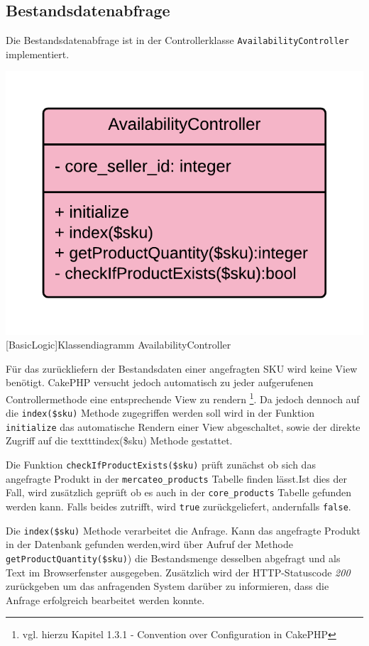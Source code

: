 	\subsection{Bestandsdatenabfrage}
	
	Die Bestandsdatenabfrage ist in der Controllerklasse \texttt{AvailabilityController} implementiert.
	
	\begin{minipage}{\linewidth}
		\vspace{1em}
		\centering
		\includegraphics[width=0.4 \linewidth]{img/AvailabilityControllerUML}
		[BasicLogic]{Klassendiagramm AvailabilityController}
		\vspace{1em}
	\end{minipage}
	
	Für das zurückliefern der Bestandsdaten einer angefragten SKU wird keine View benötigt. CakePHP versucht jedoch automatisch zu jeder aufgerufenen Controllermethode eine entsprechende View zu rendern \footnote{vgl. hierzu Kapitel 1.3.1 - Convention over Configuration in CakePHP}.  Da jedoch dennoch auf die \texttt{index(\$sku)} Methode zugegriffen werden soll wird in der Funktion \texttt{initialize} das automatische Rendern einer View abgeschaltet, sowie der direkte Zugriff auf die texttt{index(\$sku)} Methode gestattet.
	
	Die Funktion \texttt{checkIfProductExists(\$sku)} prüft zunächst ob sich das angefragte Produkt in der \texttt{mercateo\_products} Tabelle finden lässt.Ist dies der Fall, wird zusätzlich geprüft ob es auch in der \texttt{core\_products} Tabelle gefunden werden kann. Falls beides zutrifft, wird \texttt{true} zurückgeliefert, andernfalls \texttt{false}.
	
	Die \texttt{index(\$sku)} Methode verarbeitet die Anfrage. Kann das angefragte Produkt in der Datenbank gefunden werden,wird über Aufruf der Methode \texttt{getProductQuantity(\$sku)}) die Bestandsmenge desselben abgefragt und als Text im Browserfenster ausgegeben. Zusätzlich wird der HTTP-Statuscode \textit{200} zurückgeben um das anfragenden System darüber zu informieren, dass die Anfrage erfolgreich bearbeitet werden konnte.
	

